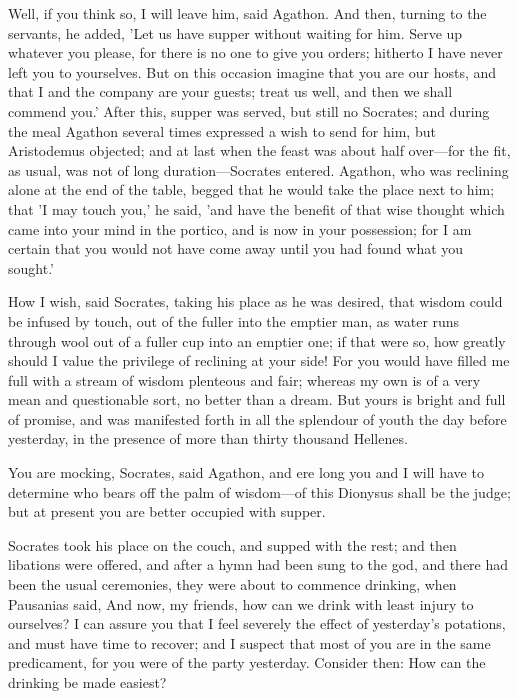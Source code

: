 \documentclass[11pt,letter]{article}
\begin{document}
\par  Well, if you think so, I will leave him, said Agathon. And then, turning to the servants, he added, 'Let us have supper without waiting for him. Serve up whatever you please, for there is no one to give you orders; hitherto I have never left you to yourselves. But on this occasion imagine that you are our hosts, and that I and the company are your guests; treat us well, and then we shall commend you.' After this, supper was served, but still no Socrates; and during the meal Agathon several times expressed a wish to send for him, but Aristodemus objected; and at last when the feast was about half over—for the fit, as usual, was not of long duration—Socrates entered. Agathon, who was reclining alone at the end of the table, begged that he would take the place next to him; that 'I may touch you,' he said, 'and have the benefit of that wise thought which came into your mind in the portico, and is now in your possession; for I am certain that you would not have come away until you had found what you sought.'

\par  How I wish, said Socrates, taking his place as he was desired, that wisdom could be infused by touch, out of the fuller into the emptier man, as water runs through wool out of a fuller cup into an emptier one; if that were so, how greatly should I value the privilege of reclining at your side! For you would have filled me full with a stream of wisdom plenteous and fair; whereas my own is of a very mean and questionable sort, no better than a dream. But yours is bright and full of promise, and was manifested forth in all the splendour of youth the day before yesterday, in the presence of more than thirty thousand Hellenes.

\par  You are mocking, Socrates, said Agathon, and ere long you and I will have to determine who bears off the palm of wisdom—of this Dionysus shall be the judge; but at present you are better occupied with supper.

\par  Socrates took his place on the couch, and supped with the rest; and then libations were offered, and after a hymn had been sung to the god, and there had been the usual ceremonies, they were about to commence drinking, when Pausanias said, And now, my friends, how can we drink with least injury to ourselves? I can assure you that I feel severely the effect of yesterday's potations, and must have time to recover; and I suspect that most of you are in the same predicament, for you were of the party yesterday. Consider then: How can the drinking be made easiest?
\end{document}
